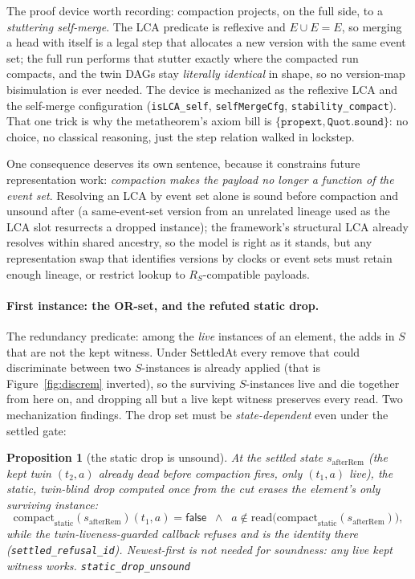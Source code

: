 \documentclass[11pt]{article}
\newtheorem{proposition}[theorem]{Proposition}
\newcommand{\lean}[1]{\texttt{#1}}
\begin{document}
The proof device worth recording:
compaction projects, on the full side, to a \emph{stuttering
self-merge}. The LCA predicate is reflexive and $E \cup E = E$, so
merging a head with itself is a legal step that allocates a new version
with the same event set; the full run performs that stutter exactly
where the compacted run compacts, and the twin DAGs stay \emph{literally
identical} in shape, so no version-map bisimulation is ever needed.
The device is mechanized as the reflexive LCA and the self-merge
configuration (\lean{isLCA\_self}, \lean{selfMergeCfg},
\lean{stability\_compact}).
That one trick is why the metatheorem's axiom bill is
$\{\lean{propext}, \lean{Quot.sound}\}$: no choice, no classical
reasoning, just the step relation walked in lockstep.

One consequence deserves its own sentence, because it constrains future
representation work: \emph{compaction makes the payload no longer a
function of the event set}. Resolving an LCA by event set alone is
sound before compaction and unsound after (a same-event-set version
from an unrelated lineage used as the LCA slot resurrects a dropped
instance); the framework's structural LCA already resolves within
shared ancestry, so the model is right as it stands, but any
representation swap that identifies versions by clocks or event sets
must retain enough lineage, or restrict lookup to $R_S$-compatible
payloads.

\paragraph{First instance: the OR-set, and the refuted static drop.}
The redundancy predicate: among the \emph{live} instances of an
element, the adds in $S$ that are not the kept witness. Under SettledAt
every remove that could discriminate between two $S$-instances is
already applied (that is Figure~\ref{fig:discrem} inverted), so the
surviving $S$-instances live and die together from here on, and
dropping all but a live kept witness preserves every read. Two
mechanization findings. The drop set must be \emph{state-dependent}
even under the settled gate:

\begin{proposition}[the static drop is unsound]
\label{prop:staticdrop}
At the settled state $s_{\mathrm{afterRem}}$ (the kept twin $(t_2, a)$
already dead before compaction fires, only $(t_1, a)$ live), the
static, twin-blind drop computed once from the cut erases the element's
only surviving instance:
\[
  \mathrm{compact}_{\mathrm{static}}(s_{\mathrm{afterRem}})(t_1, a)
  = \mathsf{false}
  \;\;\wedge\;\;
  a \notin \mathrm{read}\bigl(
  \mathrm{compact}_{\mathrm{static}}(s_{\mathrm{afterRem}})\bigr),
\]
while the twin-liveness-guarded callback refuses and is the identity
there (\lean{settled\_refusal\_id}). Newest-first is not needed for
soundness: any live kept witness works.
\hfill\lean{static\_drop\_unsound}
\end{proposition}
\end{document}
